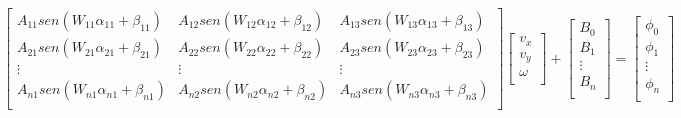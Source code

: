\[
\begin{bmatrix}
    A_{11}sen(W_{11}\alpha_{11} + \beta_{11}) &  A_{12}sen(W_{12}\alpha_{12} + \beta_{12}) &  A_{13}sen(W_{13}\alpha_{13} + \beta_{13})\\
    A_{21}sen(W_{21}\alpha_{21} + \beta_{21}) &  A_{22}sen(W_{22}\alpha_{22} + \beta_{22}) &  A_{23}sen(W_{23}\alpha_{23} + \beta_{23})\\
    \vdots & \vdots & \vdots \\
    A_{n1}sen(W_{n1}\alpha_{n1} + \beta_{n1}) &  A_{n2}sen(W_{n2}\alpha_{n2} + \beta_{n2}) &  A_{n3}sen(W_{n3}\alpha_{n3} + \beta_{n3})\\
\end{bmatrix}
\begin{bmatrix}
    v_x \\
    v_y \\
    \omega\\
\end{bmatrix}
+
\begin{bmatrix}
    B_0 \\
    B_1 \\
    \vdots \\
    B_n \\
\end{bmatrix}
=
\begin{bmatrix}
    \phi_0 \\
    \phi_1 \\
    \vdots \\
    \phi_n \\
\end{bmatrix}
\]
\newpage


